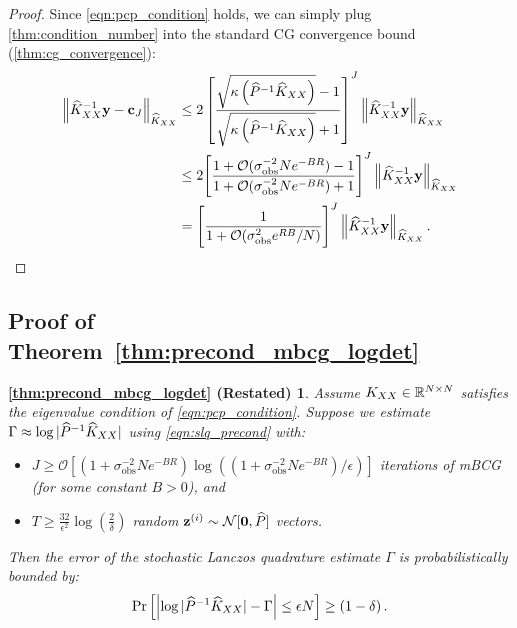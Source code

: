 \begin{proof}
Since \cref{eqn:pcp_condition} holds, we can simply plug \cref{thm:condition_number} into the standard CG convergence bound (\cref{thm:cg_convergence}):
%
\begin{align*}
  \left \Vert \trainK^{-1} \by - \bc_{J} \right \Vert_{\trainK}
  &\leq
  2 \left[ \frac{ \sqrt{ \kappa\left( \trainP^{-1} \trainK \right)}  - 1 }{\sqrt{ \kappa \left( \trainP^{-1} \trainK \right)} + 1} \right]^J
  \left \Vert \trainK^{-1} \by \right \Vert_{\trainK}
  \\
  &\leq
  2 \Bigg[ \frac{ 1 + \bigo{ \sigma^{-2}_\text{obs} N e^{-BR} } - 1 }{ 1 + \bigo{ \sigma^{-2}_\text{obs} N e^{-BR} } + 1} \Bigg]^J
  \left \Vert \trainK^{-1} \by \right \Vert_{\trainK}
  \\
  &=
  \Bigg[ \frac 1 {1 + \bigo{\sigma^{2}_\text{obs} e^{RB}/N}} \Bigg]^{J}
  \left \Vert \trainK^{-1} \by \right \Vert_{\trainK}.
\end{align*}
\end{proof}




\subsection{Proof of Theorem~\ref{thm:precond_mbcg_logdet}}
\newtheorem*{thm:precond_mbcg_logdet}{\cref{thm:precond_mbcg_logdet} (Restated)}
\begin{thm:precond_mbcg_logdet}
  Assume $K_{XX} \in \mathbb{R}^{N \times N}$ satisfies the eigenvalue condition of \cref{eqn:pcp_condition}.
	Suppose we estimate $\Gamma \approx \log \vert \widehat{P}^{-1} \widehat{K}_{XX} \vert$ using \cref{eqn:slq_precond} with:
	\begin{itemize}
		\item $J \geq \mathcal{O} \left[ (1 + \sigma^{-2}_\text{obs} N e^{-BR}) \log \left( ( 1 + \sigma^{-2}_\text{obs} N e^{-BR} ) / \epsilon \right) \right]$ iterations of mBCG (for some constant $B > 0$), and
		\item $T \geq \frac{32}{\epsilon^2} \log \left( \frac 2 \delta \right)$ random $\bz^{(i)} \sim \normaldist{\bzero}{\trainP}$ vectors.
	\end{itemize}
  Then the error of the stochastic Lanczos quadrature estimate $\Gamma$ is probabilistically bounded by:
  \begin{equation*}
    \textrm{Pr}\left[\Bigl\vert \log \vert \widehat{P}^{-1} \widehat{K}_{XX} \vert - \Gamma \Bigr\vert \leq \epsilon N \right] \geq \left( 1 - \delta \right).
  \end{equation*}
\end{thm:precond_mbcg_logdet}

